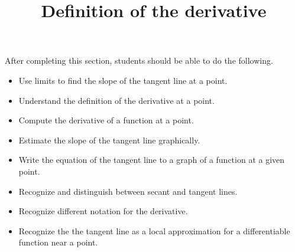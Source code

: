 \documentclass{ximera}
\title{Definition of the derivative}
\begin{document}
\begin{abstract}
\end{abstract}

\maketitle

\begin{sectionOutcomes}

After completing this section, students should be able to do the following.

\begin{itemize}
\item Use limits to find the slope of the tangent line at a point.
\item Understand the definition of the derivative at a point.
\item Compute the derivative of a function at a point.
\item Estimate the slope of the tangent line graphically.
\item Write the equation of the tangent line to a graph of a function at a given point.
\item Recognize and distinguish between secant and tangent lines.
\item Recognize different notation for the derivative.
\item Recognize the the tangent line as a local approximation for a
  differentiable function near a point.
\end{itemize}

\end{sectionOutcomes}
\end{document}
